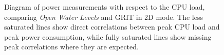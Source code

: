 \documentclass[review]{elsarticle}
\begin{document}
\begin{figure}[htbp!]
\begin{center}
	 	\begin{minipage}{\columnwidth}
	 		\centering
	 	\end{minipage}
	 	\begin{minipage}{\columnwidth}
	 		\centering
	 	\end{minipage}
	\caption{Diagram of power measurements with respect to the CPU load, comparing \textit{Open Water Levels} and GRIT in 2D mode. The less saturated lines show direct correlations between peak CPU load and peak power consumption, while fully saturated lines show missing peak correlations where they are expected.}
	\label{fig:power:CPU_2D_contrast}
\end{center}
\end{figure}
\end{document}
